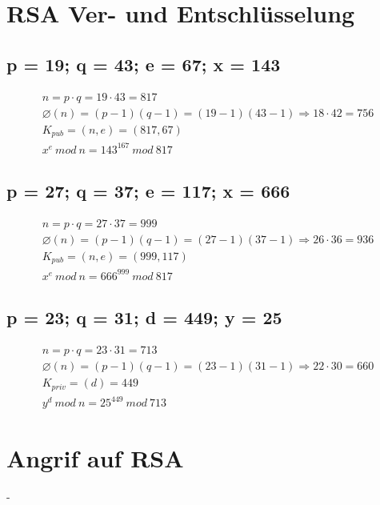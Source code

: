 \section{RSA Ver- und Entschlüsselung}

\subsection{p = 19; q = 43; e = 67; x = 143}
\label{sec:2a}
\begin{equation}
\begin{split}
n = p \cdot q = 19 \cdot 43 = 817 \\
\varnothing(n) = (p-1)(q-1) = (19-1)(43-1) \Rightarrow 18 \cdot 42 = 756 \\
K_{pub} = (n, e) = (817, 67) \\
x^{e} ~ mod ~ n = 143^{167} ~ mod ~ 817
\end{split}
\end{equation}

\subsection{p = 27; q = 37; e = 117; x = 666}
\label{sec:2b}
\begin{equation}
\begin{split}
n = p \cdot q = 27 \cdot 37 = 999 \\
\varnothing(n) = (p-1)(q-1) = (27-1)(37-1) \Rightarrow 26 \cdot 36 = 936 \\
K_{pub} = (n, e) = (999, 117) \\
x^{e} ~ mod ~ n = 666^{999} ~ mod ~ 817
\end{split}
\end{equation}

\subsection{p = 23; q = 31; d = 449; y = 25}
\label{sec:2c}
\begin{equation}
\begin{split}
n = p \cdot q = 23 \cdot 31 = 713 \\
\varnothing(n) = (p-1)(q-1) = (23-1)(31-1) \Rightarrow 22 \cdot 30 = 660 \\
K_{priv} = (d) = 449 \\
y^{d} ~ mod ~ n = 25^{449} ~ mod ~ 713
\end{split}
\end{equation}

\section{Angrif auf RSA}
-
